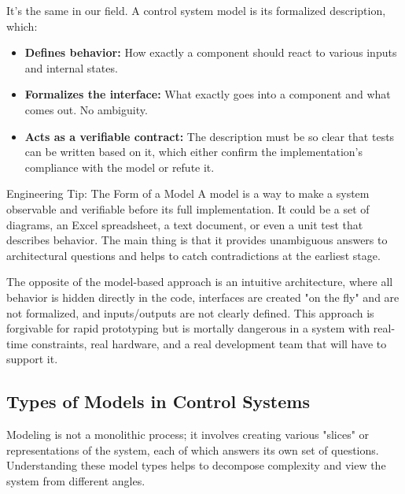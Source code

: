 It's the same in our field. A control system model is its formalized description, which:
\begin{itemize}
    \item \textbf{Defines behavior:} How exactly a component should react to various inputs and internal states.
    \item \textbf{Formalizes the interface:} What exactly goes into a component and what comes out. No ambiguity.
    \item \textbf{Acts as a verifiable contract:} The description must be so clear that tests can be written based on it, which either confirm the implementation's compliance with the model or refute it.
\end{itemize}

\begin{tipbox}{Engineering Tip: The Form of a Model}
A model is a way to make a system observable and verifiable before its full implementation. It could be a set of diagrams, an Excel spreadsheet, a text document, or even a unit test that describes behavior. The main thing is that it provides unambiguous answers to architectural questions and helps to catch contradictions at the earliest stage.
\end{tipbox}

The opposite of the model-based approach is an intuitive architecture, where all behavior is hidden directly in the code, interfaces are created "on the fly" and are not formalized, and inputs/outputs are not clearly defined. This approach is forgivable for rapid prototyping but is mortally dangerous in a system with real-time constraints, real hardware, and a real development team that will have to support it.

\subsection{Types of Models in Control Systems}

Modeling is not a monolithic process; it involves creating various "slices" or representations of the system, each of which answers its own set of questions. Understanding these model types helps to decompose complexity and view the system from different angles.


